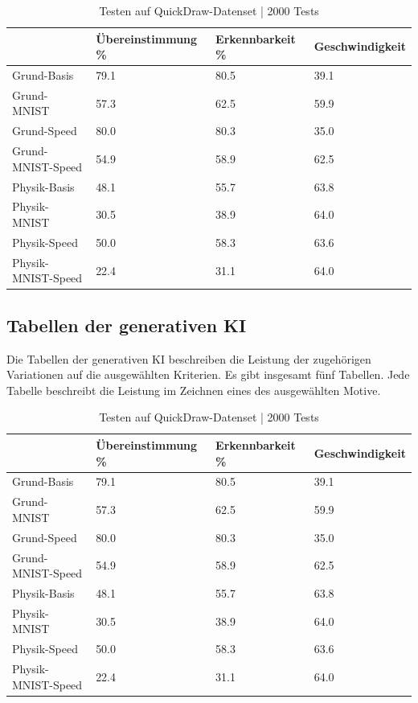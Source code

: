 \begin{table}[!ht]
    \centering
    \caption{Testen auf QuickDraw-Datenset | 2000 Tests}\label{tab:Quickdraw}
    \begin{tabular}{|l|l|l|l|}
    \hline
        ~ & Übereinstimmung \% & Erkennbarkeit \% & Geschwindigkeit \\ \hline
        Grund-Basis & 79.1 & 80.5 & 39.1 \\ \hline
        Grund-MNIST & 57.3 & 62.5 & 59.9 \\ \hline
        Grund-Speed & 80.0 & 80.3 & 35.0 \\ \hline
        Grund-MNIST-Speed & 54.9 & 58.9 & 62.5 \\ \hline
        Physik-Basis & 48.1 & 55.7 & 63.8 \\ \hline
        Physik-MNIST & 30.5 & 38.9 & 64.0 \\ \hline
        Physik-Speed & 50.0 & 58.3 & 63.6 \\ \hline
        Physik-MNIST-Speed & 22.4 & 31.1 & 64.0 \\ \hline
    \end{tabular}
\end{table}


\subsection{Tabellen der generativen KI}\label{sub:r_tab_gen}
Die Tabellen der generativen KI beschreiben die Leistung der zugehörigen
Variationen auf die ausgewählten Kriterien. Es gibt insgesamt fünf Tabellen.
Jede Tabelle beschreibt die Leistung im Zeichnen eines des ausgewählten Motive.


\begin{table}[!ht]
    \centering
    \caption{Testen auf QuickDraw-Datenset | 2000 Tests}\label{tab:Quickdraw}
    \begin{tabular}{|l|l|l|l|}
    \hline
        ~ & Übereinstimmung \% & Erkennbarkeit \% & Geschwindigkeit \\ \hline
        Grund-Basis & 79.1 & 80.5 & 39.1 \\ \hline
        Grund-MNIST & 57.3 & 62.5 & 59.9 \\ \hline
        Grund-Speed & 80.0 & 80.3 & 35.0 \\ \hline
        Grund-MNIST-Speed & 54.9 & 58.9 & 62.5 \\ \hline
        Physik-Basis & 48.1 & 55.7 & 63.8 \\ \hline
        Physik-MNIST & 30.5 & 38.9 & 64.0 \\ \hline
        Physik-Speed & 50.0 & 58.3 & 63.6 \\ \hline
        Physik-MNIST-Speed & 22.4 & 31.1 & 64.0 \\ \hline
    \end{tabular}
\end{table}




